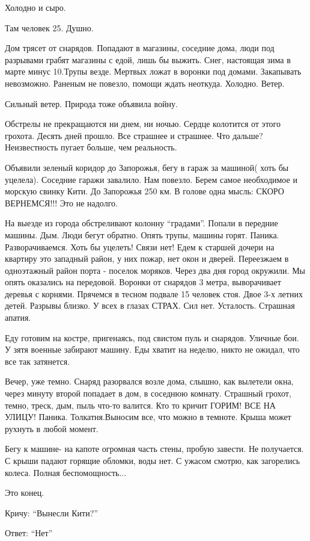 Холодно и сыро.

Там человек 25. Душно.

Дом трясет от снарядов. Попадают в магазины, соседние дома, люди под разрывами
грабят магазины с едой, лишь бы выжить. Снег, настоящая зима в марте минус
10.Трупы везде. Мертвых ложат в воронки под домами. Закапывать невозможно.
Раненым не повезло, помощи ждать неоткуда. Холодно. Ветер.

Сильный ветер. Природа тоже объявила войну.

Обстрелы не прекращаются ни днем, ни ночью. Сердце колотится от этого грохота.
Десять дней прошло. Все страшнее и страшнее. Что дальше? Неизвестность пугает
больше, чем реальность.

Объявили зеленый коридор до Запорожья, бегу в гараж за машиной( хоть бы
уцелела). Соседние гаражи завалило. Нам повезло. Берем самое необходимое и
морскую свинку Кити. До Запорожья 250 км. В голове одна мысль: СКОРО
ВЕРНЕМСЯ!!! Это не надолго.

На выезде из города обстреливают колонну \enquote{градами}. Попали в передние машины.
Дым. Люди бегут обратно.  Опять трупы, машины горят. Паника. Разворачиваемся.
Хоть бы уцелеть! Связи нет! Едем к старшей дочери на квартиру это западный
район, у них пожар, нет окон и дверей. Переезжаем в одноэтажный район порта -
поселок моряков. Через два дня город окружили. Мы опять оказались на передовой.
Воронки от снарядов 3 метра, выворачивает деревья с корнями. Прячемся в тесном
подвале 15 человек стоя. Двое 3-х летних детей. Разрывы близко. У всех в глазах
СТРАХ.  Сил нет. Усталость. Страшная апатия.

Еду готовим на костре, пригенаясь, под свистом пуль и снарядов. Уличные бои. У
зятя военные забирают машину. Еды хватит на неделю, никто не ожидал, что все
так затянется.

Вечер, уже темно. Снаряд разорвался возле дома, слышно, как вылетели окна,
через минуту второй попадает в дом, в соседнюю комнату. Страшный грохот, темно,
треск, дым, пыль что-то валится. Кто то  кричит ГОРИМ! ВСЕ НА УЛИЦУ! Паника.
Толкатня.Выносим все, что можно в темноте. Крыша может рухнуть в любой момент.

Бегу к машине- на капоте огромная часть стены, пробую завести. Не получается. С
крыши падают горящие обломки, воды нет. С ужасом смотрю, как загорелись колеса.
Полная беспомощность...

Это конец.

Кричу: \enquote{Вынесли Кити?}

Ответ: \enquote{Нет}

